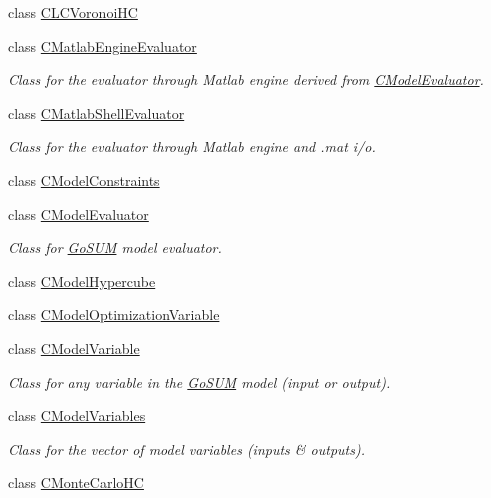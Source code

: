 \begin{DoxyCompactItemize}
class \hyperlink{class_go_s_u_m_1_1_c_l_c_voronoi_h_c}{C\-L\-C\-Voronoi\-H\-C}
\item 
class \hyperlink{class_go_s_u_m_1_1_c_matlab_engine_evaluator}{C\-Matlab\-Engine\-Evaluator}
\begin{DoxyCompactList}\small\item\em Class for the evaluator through Matlab engine derived from \hyperlink{class_go_s_u_m_1_1_c_model_evaluator}{C\-Model\-Evaluator}. \end{DoxyCompactList}\item 
class \hyperlink{class_go_s_u_m_1_1_c_matlab_shell_evaluator}{C\-Matlab\-Shell\-Evaluator}
\begin{DoxyCompactList}\small\item\em Class for the evaluator through Matlab engine and .mat i/o. \end{DoxyCompactList}\item 
class \hyperlink{class_go_s_u_m_1_1_c_model_constraints}{C\-Model\-Constraints}
\item 
class \hyperlink{class_go_s_u_m_1_1_c_model_evaluator}{C\-Model\-Evaluator}
\begin{DoxyCompactList}\small\item\em Class for \hyperlink{struct_go_s_u_m}{Go\-S\-U\-M} model evaluator. \end{DoxyCompactList}\item 
class \hyperlink{class_go_s_u_m_1_1_c_model_hypercube}{C\-Model\-Hypercube}
\item 
class \hyperlink{class_go_s_u_m_1_1_c_model_optimization_variable}{C\-Model\-Optimization\-Variable}
\item 
class \hyperlink{class_go_s_u_m_1_1_c_model_variable}{C\-Model\-Variable}
\begin{DoxyCompactList}\small\item\em Class for any variable in the \hyperlink{struct_go_s_u_m}{Go\-S\-U\-M} model (input or output). \end{DoxyCompactList}\item 
class \hyperlink{class_go_s_u_m_1_1_c_model_variables}{C\-Model\-Variables}
\begin{DoxyCompactList}\small\item\em Class for the vector of model variables (inputs \& outputs). \end{DoxyCompactList}\item 
class \hyperlink{class_go_s_u_m_1_1_c_monte_carlo_h_c}{C\-Monte\-Carlo\-H\-C}
\item 

\end{DoxyCompactItemize}
